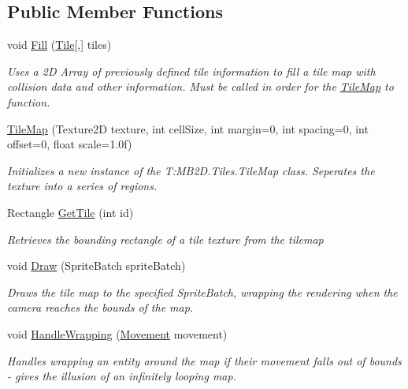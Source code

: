 \subsection*{Public Member Functions}
\begin{DoxyCompactItemize}
\item 
void \hyperlink{class_m_b2_d_1_1_tiles_1_1_tile_map_acc786702f8dfb76227fcd76ce0b20510}{Fill} (\hyperlink{class_m_b2_d_1_1_tile}{Tile}\mbox{[},\mbox{]} tiles)
\begin{DoxyCompactList}\small\item\em Uses a 2D Array of previously defined tile information to fill a tile map with collision data and other information. Must be called in order for the \hyperlink{class_m_b2_d_1_1_tiles_1_1_tile_map}{Tile\+Map} to function. \end{DoxyCompactList}\item 
\hyperlink{class_m_b2_d_1_1_tiles_1_1_tile_map_a8618b4770e24bf8cdb327dfee48afeef}{Tile\+Map} (Texture2D texture, int cell\+Size, int margin=0, int spacing=0, int offset=0, float scale=1.\+0f)
\begin{DoxyCompactList}\small\item\em Initializes a new instance of the T\+:\+M\+B2\+D.\+Tiles.\+Tile\+Map class. Seperates the texture into a series of regions. \end{DoxyCompactList}\item 
Rectangle \hyperlink{class_m_b2_d_1_1_tiles_1_1_tile_map_a483549827f26a5282888728f20b56a8a}{Get\+Tile} (int id)
\begin{DoxyCompactList}\small\item\em Retrieves the bounding rectangle of a tile texture from the tilemap \end{DoxyCompactList}\item 
void \hyperlink{class_m_b2_d_1_1_tiles_1_1_tile_map_aa4c7f815bf7b9fc53a4dcf1a2b0df175}{Draw} (Sprite\+Batch sprite\+Batch)
\begin{DoxyCompactList}\small\item\em Draws the tile map to the specified Sprite\+Batch, wrapping the rendering when the camera reaches the bounds of the map. \end{DoxyCompactList}\item 
void \hyperlink{class_m_b2_d_1_1_tiles_1_1_tile_map_ad00d974648e7f3070133569e5e98d261}{Handle\+Wrapping} (\hyperlink{class_m_b2_d_1_1_entity_component_1_1_movement}{Movement} movement)
\begin{DoxyCompactList}\small\item\em Handles wrapping an entity around the map if their movement falls out of bounds -\/ gives the illusion of an infinitely looping map. \end{DoxyCompactList}\end{DoxyCompactItemize}
